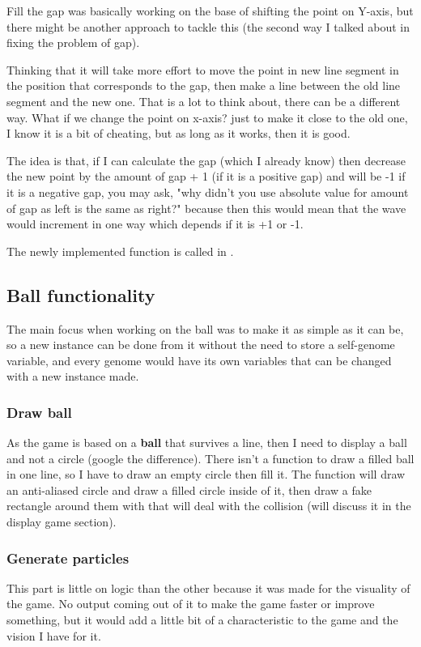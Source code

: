 Fill the gap was basically working on the base of shifting the point on Y-axis, but there might be another approach to tackle this (the second way I talked about in fixing the problem of gap).

Thinking that it will take more effort to move the point in new line segment in the position that corresponds to the gap, then make a line between the old line segment and the new one. That is a lot to think about, there can be a different way. What if we change the point on x-axis? just to make it close to the old one, I know it is a bit of cheating, but as long as it works, then it is good.

The idea is that, if I can calculate the gap (which I already know) then decrease the new point by the amount of gap + 1 (if it is a positive gap) and will be -1 if it is a negative gap, you may ask, "why didn't you use absolute value for amount of gap as left is the same as right?" because then this would mean that the wave would increment in one way which depends if it is +1 or -1.

The newly implemented function is called  in .


\subsection{Ball functionality}\label{ball-functionality}
The main focus when working on the ball was to make it as simple as it can be, so a new instance can be done from it without the need to store a self-genome variable, and every genome would have its own variables that can be changed with a new instance made.

\subsubsection{Draw ball}\label{draw-ball}
As the game is based on a \textbf{ball} that survives a line, then I need to display a ball and not a circle (google the difference). There isn't a function to draw a filled ball in one line, so I have to draw an empty circle then fill it. The function  will draw an anti-aliased circle and  draw a filled circle inside of it, then draw a fake rectangle around them with  that will deal with the collision (will discuss it in the display game section).

\subsubsection{Generate particles}\label{generate-particles}
This part is little on logic than the other because it was made for the visuality of the game. No output coming out of it to make the game faster or improve something, but it would add a little bit of a characteristic to the game and the vision I have for it.

